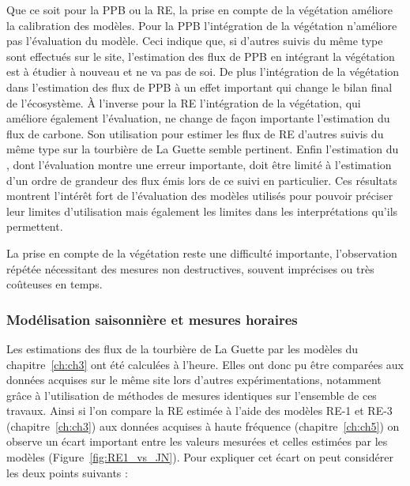 Que ce soit pour la PPB ou la RE, la prise en compte de la végétation améliore la calibration des modèles.
Pour la PPB l'intégration de la végétation n'améliore pas l'évaluation du modèle.
Ceci indique que, si d'autres suivis du même type sont effectués sur le site, l'estimation des flux de PPB en intégrant la végétation est à étudier à nouveau et ne va pas de soi.
De plus l'intégration de la végétation dans l'estimation des flux de PPB à un effet important qui change le bilan final de l'écosystème.
À l'inverse pour la RE l'intégration de la végétation, qui améliore également l'évaluation, ne change de façon importante l'estimation du flux de carbone.
Son utilisation pour estimer les flux de RE d'autres suivis du même type sur la tourbière de La Guette semble pertinent.
Enfin l'estimation du \chh, dont l'évaluation montre une erreur importante, doit être limité à l'estimation d'un ordre de grandeur des flux émis lors de ce suivi en particulier.
Ces résultats montrent l'intérêt fort de l'évaluation des modèles utilisés pour pouvoir préciser leur limites d'utilisation mais également les limites dans les interprétations qu'ils permettent.

La prise en compte de la végétation reste une difficulté importante, l'observation répétée nécessitant des mesures non destructives, souvent imprécises ou très coûteuses en temps.


\subsubsection*{Modélisation saisonnière et mesures horaires}

Les estimations des flux de la tourbière de La Guette par les modèles du chapitre~\ref{ch:ch3} ont été calculées à l'heure.
Elles ont donc pu être comparées aux données acquises sur le même site lors d'autres expérimentations, notamment grâce à l'utilisation de méthodes de mesures identiques sur l'ensemble de ces travaux.
Ainsi si l'on compare la RE estimée à l'aide des modèles RE-1 et RE-3 (chapitre~\ref{ch:ch3}) aux données acquises à haute fréquence (chapitre~\ref{ch:ch5}) on observe un écart important entre les valeurs mesurées et celles estimées par les modèles (Figure~\ref{fig:RE1_vs_JN}).
Pour expliquer cet écart on peut considérer les deux points suivants : 


